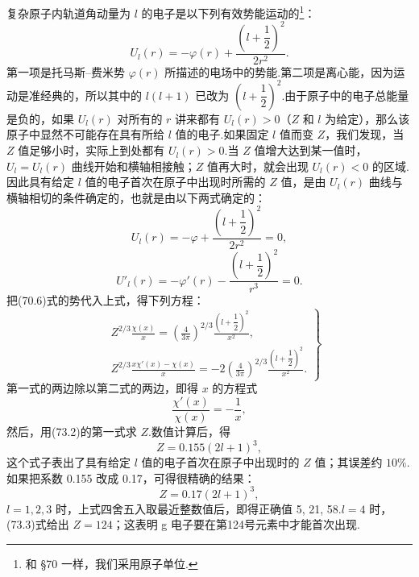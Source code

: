 复杂原子内轨道角动量为 $l$ 的电子是以下列有效势能运动的\footnote{和 §70 一样，我们采用原子单位.}：
\begin{equation*}
  U_l(r)=-\varphi(r)+\frac{\left(l+\dfrac{1}{2}\right)^{2}}{2r^{2}}.
\end{equation*}
第一项是托马斯–费米势 $\varphi(r)$ 所描述的电场中的势能.第二项是离心能，因为运动是准经典的，所以其中的 $l(l+1)$ 已改为 $\left(l+\dfrac{1}{2}\right)^{2}$.由于原子中的电子总能量是负的，如果 $U_l(r)$ 对所有的 $r$ 讲来都有 $U_l(r)>0$（$Z$ 和 $l$ 为给定），那么该原子中显然不可能存在具有所给 $l$ 值的电子.如果固定 $l$ 值而变 $Z$，我们发现，当 $Z$ 值足够小时，实际上到处都有 $U_l(r)>0$.当 $Z$ 值增大达到某一值时，$U_l=U_l(r)$ 曲线开始和横轴相接触；$Z$ 值再大时，就会出现 $U_l(r)<0$ 的区域.因此具有给定 $l$ 值的电子首次在原子中出现时所需的 $Z$ 值，是由 $U_l(r)$ 曲线与横轴相切的条件确定的，也就是由以下两式确定的：
\begin{equation*}
  U_l(r)=-\varphi+\frac{\left(l+\dfrac{1}{2}\right)^{2}}{2r^{2}}=0,
\end{equation*}
\begin{equation*}
  U'_l(r)=-\varphi'(r)-\frac{\left(l+\dfrac{1}{2}\right)^{2}}{r^{3}}=0.
\end{equation*}
把(70.6)式的势代入上式，得下列方程：
\begin{equation}
\left.\begin{aligned}
  &Z^{2/3}\frac{\chi(x)}{x}
  =\left(\frac{4}{3\pi}\right)^{2/3}
  \frac{\left(l+\dfrac{1}{2}\right)^{2}}{x^{2}},\\
  &Z^{2/3}\frac{x\chi'(x)-\chi(x)}{x}
  =-2\left(\frac{4}{3\pi}\right)^{2/3}
  \frac{\left(l+\dfrac{1}{2}\right)^{2}}{x^{2}}.
\end{aligned}\right\}
\end{equation}
第一式的两边除以第二式的两边，即得 $x$ 的方程式
\begin{equation*}
  \frac{\chi'(x)}{\chi(x)}=-\frac{1}{x},
\end{equation*}
然后，用(73.2)的第一式求 $Z$.数值计算后，得
\begin{equation*}
  Z=0.155(2l+1)^{3},
\end{equation*}
这个式子表出了具有给定 $l$ 值的电子首次在原子中出现时的 $Z$ 值；其误差约 $10\%$.如果把系数 0.155 改成 0.17，可得很精确的结果：
\begin{equation}
  Z=0.17(2l+1)^{3},
\end{equation}
$l=1,2,3$ 时，上式四舍五入取最近整数值后，即得正确值 5, 21, 58.$l=4$ 时，(73.3)式给出 $Z=124$；这表明 g 电子要在第124号元素中才能首次出现.


